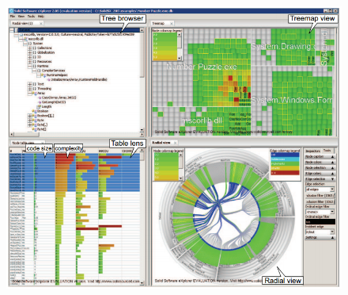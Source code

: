 \begin{figure}[H]
	\centering
	\includegraphics[width=1.0\textwidth]{figures/solidsx.png}
	\caption{}
	\label{fig:solidsx}
\end{figure}
